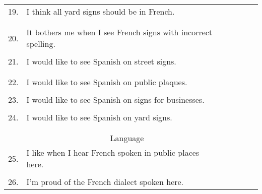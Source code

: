 \begin{longtable}[c]{| r p{} | c | c | c | c | c |}
      \hline
      19. & I think all yard signs should be in French.                               & & & & & \\
          &                                                                           & & & & & \\
          &                                                                           & & & & & \\
      \hline
      20. & It bothers me when I see French signs with incorrect spelling.            & & & & & \\
          &                                                                           & & & & & \\
      \hline
      21. & I would like to see Spanish on street signs.                              & & & & & \\
          &                                                                           & & & & & \\
          &                                                                           & & & & & \\
      \hline
      22. & I would like to see Spanish on public plaques.                            & & & & & \\
          &                                                                           & & & & & \\
      \hline
      23. & I would like to see Spanish on signs for businesses.                      & & & & & \\
          &                                                                           & & & & & \\
      \hline
      24. & I would like to see Spanish on yard signs.                                & & & & & \\
          &                                                                           & & & & & \\
          &                                                                           & & & & & \\
      \hline
      \multicolumn{6}{c}{Language} \\
      \hline
      25. & I like when I hear French spoken in public places here.                   & & & & & \\
          &                                                                           & & & & & \\
      \hline
      26. & I'm proud of the French dialect spoken here.                              & & & & & \\

\end{longtable}
